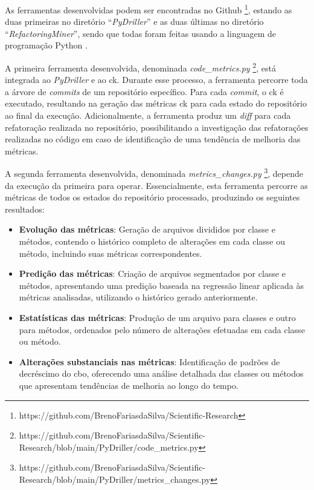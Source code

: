 As ferramentas desenvolvidas podem ser encontradas no Github \footnote{https://github.com/BrenoFariasdaSilva/Scientific-Research}, estando as duas primeiras no diretório ``\textit{PyDriller}'' e as duas últimas no diretório ``\textit{RefactoringMiner}'', sendo que todas foram feitas usando a linguagem de programação Python \cite{PythonProgrammingLanguage}.

A primeira ferramenta desenvolvida, denominada \textit{code\_metrics.py} \footnote{https://github.com/BrenoFariasdaSilva/Scientific-Research/blob/main/PyDriller/code_metrics.py}, está integrada ao \textit{PyDriller} e ao \gls{ck}. Durante esse processo, a ferramenta percorre toda a árvore de \textit{commits} de um repositório específico. Para cada \textit{commit}, o \gls{ck} é executado, resultando na geração das métricas \gls{ck} para cada estado do repositório ao final da execução. Adicionalmente, a ferramenta produz um \textit{diff} para cada refatoração realizada no repositório, possibilitando a investigação das refatorações realizadas no código em caso de identificação de uma tendência de melhoria das métricas.

A segunda ferramenta desenvolvida, denominada \textit{metrics\_changes.py} \footnote{https://github.com/BrenoFariasdaSilva/Scientific-Research/blob/main/PyDriller/metrics_changes.py},  depende da execução da primeira para operar. Essencialmente, esta ferramenta percorre as métricas de todos os estados do repositório processado, produzindo os seguintes resultados:

\begin{itemize}
    \item \textbf{Evolução das métricas}: Geração de arquivos divididos por classe e métodos, contendo o histórico completo de alterações em cada classe ou método, incluindo suas métricas correspondentes.
    \item \textbf{Predição das métricas}: Criação de arquivos segmentados por classe e métodos, apresentando uma predição baseada na regressão linear aplicada às métricas analisadas, utilizando o histórico gerado anteriormente.
    \item \textbf{Estatísticas das métricas}: Produção de um arquivo para classes e outro para métodos, ordenados pelo número de alterações efetuadas em cada classe ou método.
    \item \textbf{Alterações substanciais nas métricas}: Identificação de padrões de decréscimo do \gls{cbo}, oferecendo uma análise detalhada das classes ou métodos que apresentam tendências de melhoria ao longo do tempo.
\end{itemize}

